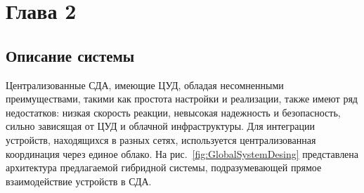 \documentclass[a4paper,12pt]{article}
\begin{document}
\newpage



\section{Глава 2}

\subsection{Описание системы}
Централизованные СДА, имеющие ЦУД, обладая несомненными преимуществами, такими как простота настройки и реализации,
также имеют ряд недостатков: низкая скорость реакции, невысокая надежность и безопасность, сильно зависящая от ЦУД
и облачной инфраструктуры. Для интеграции устройств, находящихся в разных сетях, используется централизованная
координация через единое облако. На рис.~\ref{fig:GlobalSystemDesing} представлена архитектура предлагаемой гибридной системы, подразумевающей
прямое взаимодействие устройств в СДА.
\end{document}
